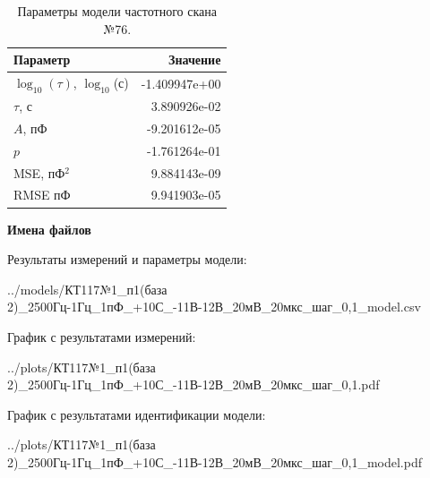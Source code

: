 \begin{table}[!ht]
    \centering
    \caption{Параметры модели частотного скана №76.}
    \begin{tabular}{|l|r|}
        \hline
        Параметр                                       & Значение                  \\ \hline
        $\log_{10}(\tau)$, $\log_{10}$(с)              & -1.409947e+00             \\ \hline
        $\tau$, с                                      & 3.890926e-02              \\ \hline
        $A$, пФ                                        & -9.201612e-05             \\ \hline
        $p$                                            & -1.761264e-01             \\ \hline
        MSE, пФ$^2$                                    & 9.884143e-09              \\ \hline
        RMSE пФ                                        & 9.941903e-05              \\ \hline
    \end{tabular}
    \label{table:frequency_scan_model_76}
\end{table}

\textbf{Имена файлов}

Результаты измерений и параметры модели:

\scriptsize../models/КТ117№1\_п1(база 2)\_2500Гц-1Гц\_1пФ\_+10С\_-11В-12В\_20мВ\_20мкс\_шаг\_0,1\_model.csv
\normalsize

График с результатами измерений:

\scriptsize../plots/КТ117№1\_п1(база 2)\_2500Гц-1Гц\_1пФ\_+10С\_-11В-12В\_20мВ\_20мкс\_шаг\_0,1.pdf
\normalsize

График с результатами идентификации модели:

\scriptsize../plots/КТ117№1\_п1(база 2)\_2500Гц-1Гц\_1пФ\_+10С\_-11В-12В\_20мВ\_20мкс\_шаг\_0,1\_model.pdf
\normalsize


